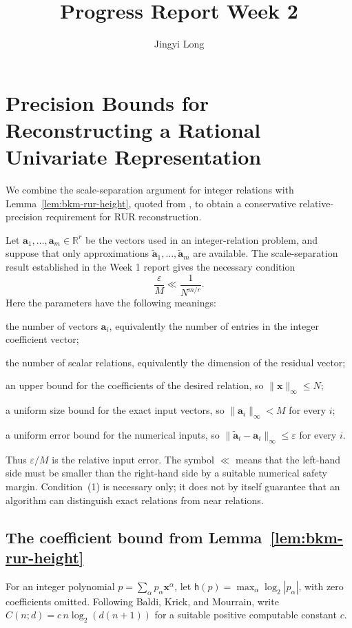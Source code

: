 \documentclass{weeklyprogress}
\title{Progress Report Week 2}
\author{Jingyi Long}
\begin{document}
\section{Precision Bounds for Reconstructing a Rational Univariate Representation}

We combine the scale-separation argument for integer relations with
Lemma~\ref{lem:bkm-rur-height}, quoted from
\cite[Lemma~4.3]{baldi-krick-mourrain}, to obtain a conservative
relative-precision requirement for RUR reconstruction.

Let $\bm{a}_1,\ldots,\bm{a}_m\in\mathbb{R}^r$ be the vectors used in an
integer-relation problem, and suppose that only approximations
$\widetilde{\bm{a}}_1,\ldots,\widetilde{\bm{a}}_m$ are available.  The
scale-separation result established in the Week 1 report gives the necessary
condition
\[
 \frac{\varepsilon}{M}\ll\frac{1}{N^{m/r}}.
 \tag{1}
\]
Here the parameters have the following meanings:
\begin{description}[leftmargin=2.5em,labelindent=0em,style=nextline]
  \item[$m$] the number of vectors $\bm{a}_i$, equivalently the number of
  entries in the integer coefficient vector;
  \item[$r$] the number of scalar relations, equivalently the dimension of
  the residual vector;
  \item[$N$] an upper bound for the coefficients of the desired relation,
  so $\lVert\bm{x}\rVert_\infty\leq N$;
  \item[$M$] a uniform size bound for the exact input vectors, so
  $\lVert\bm{a}_i\rVert_\infty<M$ for every $i$;
  \item[$\varepsilon$] a uniform error bound for the numerical inputs, so
  $\lVert\widetilde{\bm{a}}_i-\bm{a}_i\rVert_\infty\leq\varepsilon$ for
  every $i$.
\end{description}
Thus $\varepsilon/M$ is the relative input error.
The symbol $\ll$ means that the left-hand side must be smaller than the
right-hand side by a suitable numerical safety margin.  Condition~(1) is
necessary only; it does not by itself guarantee that an algorithm can
distinguish exact relations from near relations.

\subsection{The coefficient bound from Lemma~\ref{lem:bkm-rur-height}}

For an integer polynomial $p=\sum_\alpha p_\alpha\bm{x}^\alpha$, let
$\mathsf{h}(p)=\max_\alpha\log_2|p_\alpha|$, with zero coefficients omitted.
Following Baldi, Krick, and Mourrain, write
$C(n;d)=c\,n\log_2(d(n+1))$ for a suitable positive computable constant $c$.
\end{document}
